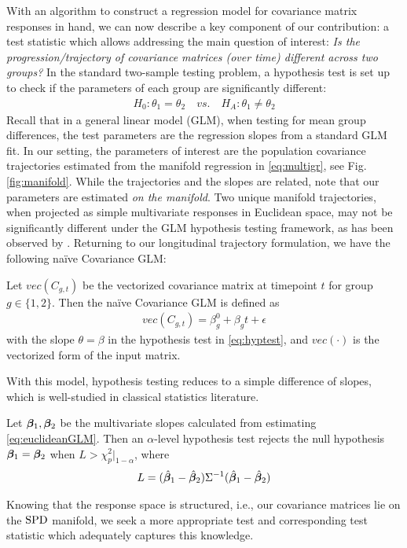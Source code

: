 With an algorithm to construct a regression model for covariance matrix responses in hand, we can now describe a key
component of our contribution: a test statistic which allows addressing the main question of interest: 
{\em Is the progression/trajectory of covariance matrices (over time) different across two groups?} In the standard two-sample testing problem, a hypothesis test is set up
to check if the parameters of each group are significantly different:
\begin{align}\label{eq:hyptest}
H_0: \theta_1 = \theta_2 \quad vs. \quad H_A: \theta_1 \neq \theta_2
\end{align}
Recall that in a general linear model (GLM), when testing for mean group differences, the test parameters are the regression slopes from a standard GLM fit. 
In our setting, the parameters of interest are the population covariance trajectories estimated from the manifold regression in \eqref{eq:multigr}, see Fig. \ref{fig:manifold}. 
While the trajectories and the slopes are related, note that our parameters are estimated {\em on the manifold}. 
Two unique manifold trajectories, when projected as simple multivariate responses in Euclidean space, may not be significantly different under the GLM hypothesis testing framework, as has been observed by \cite{du2014geodesic}. Returning to our longitudinal trajectory formulation, we have the following na\"ive Covariance GLM:
\begin{definition} Let $vec(C_{g,t})$ be the vectorized covariance matrix at timepoint $t$ for group $g \in \{1,2\}$. Then the 
na\"ive Covariance GLM is defined as
\begin{align}\label{eq:euclideanGLM}
vec(C_{g,t}) = \beta_g^{0} + \beta_g t + \epsilon
\end{align}
with the slope $\theta = \beta$ in the hypothesis test in \eqref{eq:hyptest}, and $vec(\cdot)$ is the vectorized form of the input matrix. 
\end{definition}
With this model, hypothesis testing reduces to a simple difference of slopes, which is well-studied in classical statistics literature.
\begin{definition}\citep{seber2003linear} \label{eq:euclideanhyptest}
Let $\bm{\beta}_1,\bm{\beta}_2$ be the multivariate slopes calculated from estimating \eqref{eq:euclideanGLM}.
Then an $\alpha$-level hypothesis test rejects the null hypothesis $\bm{\beta}_1 = \bm{\beta}_2$ when $L > \chi^2_{p}|_{1-\alpha}$, where
\begin{align}
L = (\hat{\bm{\beta}}_1 - \hat{\bm{\beta}}_2)\Sigma^{-1}(\hat{\bm{\beta}}_1 - \hat{\bm{\beta}}_2)
\end{align}
\end{definition}
Knowing that the response space is structured, i.e., our covariance matrices lie on the $\text{SPD}$ manifold, we seek a more appropriate test and corresponding test statistic which 
adequately captures this knowledge. 

